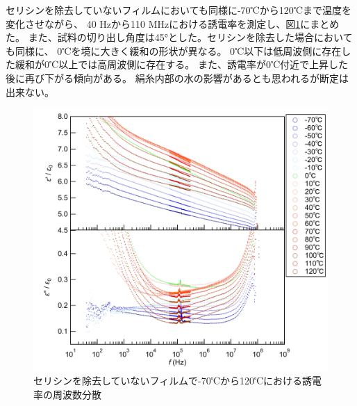 \documentclass[dvipdfmx,12pt,a4paper]{jreport}
\begin{document}
			セリシンを除去していないフィルムにおいても同様に-70℃から120℃まで温度を変化させながら、
			40 Hzから110 MHzにおける誘電率を測定し、図\ref{温度_誘電率_セリシンあり}にまとめた。
			また、試料の切り出し角度は45°とした。セリシンを除去した場合においても同様に、
			0℃を境に大きく緩和の形状が異なる。
			0℃以下は低周波側に存在した緩和が0℃以上では高周波側に存在する。
			また、誘電率が0℃付近で上昇した後に再び下がる傾向がある。
			絹糸内部の水の影響があるとも思われるが断定は出来ない。
			\begin{figure}[h]
				\centering
				\includegraphics[scale=1]{温度_誘電率_セリシンあり.jpg}
				\caption{セリシンを除去していないフィルムで-70℃から120℃における誘電率の周波数分散}
				\label{温度_誘電率_セリシンあり}
			\end{figure}
\end{document}

